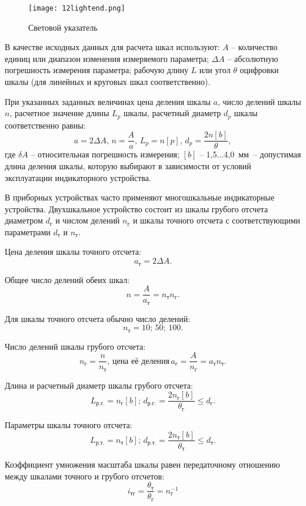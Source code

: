 \begin{figure}[h!]
	\caption{ Световой указатель }
	\texttt{[image: 12lightend.png]}
	\label{pic:12lightend}
\end{figure}

В качестве исходных данных для расчета шкал используют: $ A $ -- количество единиц или диапазон изменения измеряемого параметра; $ \Delta A $ -- абсолютную погрешность измерения параметра; рабочую длину $ L $ или угол $ \theta $ оцифровки шкалы (для линейных и круговых шкал соответственно). 

При указанных заданных величинах цена деления шкалы $ a $, число делений шкалы $ n $, расчетное значение длины $ L_p $ шкалы, расчетный диаметр $ d_p $ шкалы соответственно равны:
\[ a = 2\Delta A, \, n = \dfrac{A}{a}, \, L_p = n[p], \, d_p = \dfrac{2n[b]}{\theta},  \]
где $ \delta A $ -- относительная погрешность измерения; $ [b] $ -- 1,5$ \ldots $4,0~мм~-- допустимая длина деления шкалы, которую выбирают в зависимости от условий эксплуатации индикаторного устройства. 

В приборных устройствах часто применяют многошкальные индикаторные устройства. Двухшкальное устройство состоит из шкалы грубого отсчета диаметром $ d_\text{г} $ и числом делений $ n_\text{г} $ и шкалы точного отсчета с соответствующими параметрами $ d_\text{т} $ и $ n_\text{т} $.

Цена деления шкалы точного отсчета:
\[ a_\text{т} = 2\Delta A.  \]

Общее число делений обеих шкал:
\[ n = \dfrac{A}{a_\text{т}} = n_\text{т}n_\text{г}. \]

Для шкалы точного отсчета обычно число делений:
\[ n_\text{т} = 10;\,50;\,100. \]

Число делений шкалы грубого отсчета:
\[ n_\text{г}= \dfrac{n}{n_\text{т}}, \, \text{цена её деления} \, a_\text{г} = \dfrac{A}{n_\text{г}} = a_\text{т}n_\text{т}. \]

Длина и расчетный диаметр шкалы грубого отсчета:
\[ L_\text{р.г.} = n_\text{г}[b]; \, d_\text{р.г.} = \dfrac{2n_\text{г}[b]}{\theta_\text{г}} \leq d_\text{г}. \]

Параметры шкалы точного отсчета:
\[ L_\text{р.т.} = n_\text{т}[b]; \, d_\text{р.т.} = \dfrac{2n_\text{т}[b]}{\theta_\text{т}} \leq d_\text{т}. \]

Коэффициент умножения масштаба шкалы равен передаточному отношению между шкалами точного и грубого отсчетов:
\[ i_\text{тг} = \dfrac{\theta_\text{т}}{\theta_\text{г}} = n_\text{г}^{-1} \]

